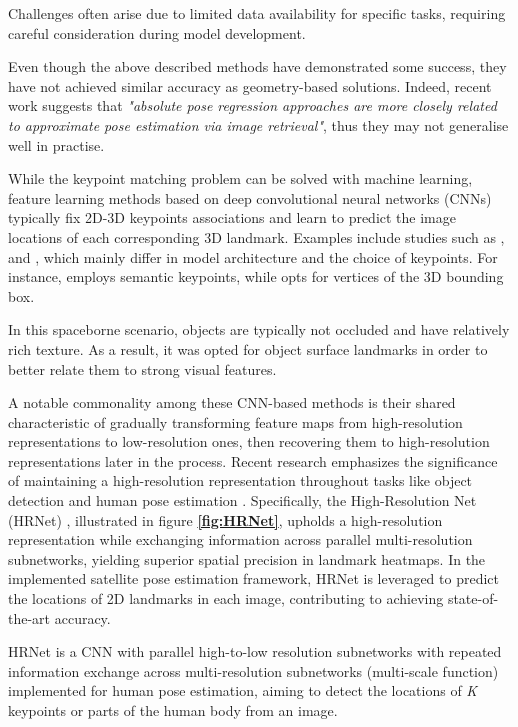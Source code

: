 Challenges often arise due to limited data availability for specific tasks, requiring careful consideration during model development.

Even though the above described methods have demonstrated some success, they have not achieved similar accuracy as geometry-based solutions. Indeed, recent work \cite{LimCNN} suggests that \textit{"absolute pose regression approaches are more closely related to approximate pose estimation via image retrieval"}, thus they may not generalise  well in practise.

While the keypoint matching problem can be solved with machine learning, feature learning methods based on deep convolutional neural networks (CNNs) typically fix 2D-3D keypoints associations and learn to predict the image locations of each corresponding 3D landmark. Examples include studies such as \cite{E1}, \cite{E2} and \cite{E3}, which mainly differ in model architecture and the choice of keypoints. For instance, \cite{E2} employs semantic keypoints, while \cite{E3} opts for vertices of the 3D bounding box. 

In this spaceborne scenario, objects are typically not occluded and have relatively rich texture. As a result, it was opted for object surface landmarks in order to better relate them to strong visual features.

A notable commonality among these CNN-based methods is their shared characteristic of gradually transforming feature maps from high-resolution representations to low-resolution ones, then recovering them to high-resolution representations later in the process. Recent research emphasizes the significance of maintaining a high-resolution representation throughout tasks like object detection and human pose estimation \cite{sun2019deep}\cite{HRNet2}. Specifically, the High-Resolution Net (HRNet) \cite{sun2019deep}, illustrated in figure \textbf{\ref{fig:HRNet}}, upholds a high-resolution representation while exchanging information across parallel multi-resolution subnetworks, yielding superior spatial precision in landmark heatmaps. In the implemented satellite pose estimation framework, HRNet is leveraged to predict the locations of 2D landmarks in each image, contributing to achieving state-of-the-art accuracy.

HRNet is a CNN with parallel high-to-low resolution subnetworks with repeated information exchange across multi-resolution subnetworks (multi-scale function) implemented for human pose estimation, aiming to detect the locations of \textit{K} keypoints or parts of the human body from an image.\\

